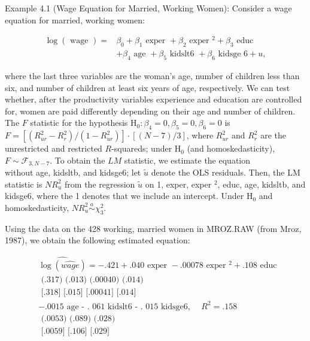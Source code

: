\documentclass[10pt]{article}
\begin{document}
Example 4.1 (Wage Equation for Married, Working Women): Consider a wage equation for married, working women:


\begin{align*}
\log (\text { wage })= & \beta_{0}+\beta_{1} \text { exper }+\beta_{2} \text { exper }^{2}+\beta_{3} \text { educ } \\
& +\beta_{4} \text { age }+\beta_{5} \text { kidslt6 }+\beta_{6} \text { kidsge } 6+u, \tag{4.16}
\end{align*}


where the last three variables are the woman's age, number of children less than six, and number of children at least six years of age, respectively. We can test whether, after the productivity variables experience and education are controlled for, women are paid differently depending on their age and number of children. The $F$ statistic for the hypothesis $\mathrm{H}_{0}: \beta_{4}=0, \beta_{5}=0, \beta_{6}=0$ is $F=\left[\left(R_{u r}^{2}-R_{r}^{2}\right) /\left(1-R_{u r}^{2}\right)\right] \cdot[(N-7) / 3]$, where $R_{u r}^{2}$ and $R_{r}^{2}$ are the unrestricted and restricted $R$-squareds; under $\mathrm{H}_{0}$ (and homoskedasticity), $F \sim \mathscr{F}_{3, N-7}$. To obtain the $L M$ statistic, we estimate the equation\\
without age, kidsltb, and kidsge6; let $\tilde{u}$ denote the OLS residuals. Then, the LM statistic is $N R_{u}^{2}$ from the regression $\tilde{u}$ on 1, exper, exper ${ }^{2}$, educ, age, kidsltb, and kidsge6, where the 1 denotes that we include an intercept. Under $\mathrm{H}_{0}$ and homoskedasticity, $N R_{u}^{2} \stackrel{a}{\sim} \chi_{3}^{2}$.

Using the data on the 428 working, married women in MROZ.RAW (from Mroz, 1987), we obtain the following estimated equation:

$$
\begin{aligned}
& \widehat{\log (\widehat{w a g e})}=-.421+.040 \text { exper }-.00078 \text { exper }^{2}+.108 \text { educ } \\
& \text { (.317) (.013) (.00040) (.014) } \\
& \text { [.318] [.015] [.00041] [.014] } \\
& -.0015 \text { age - . } 061 \text { kidslt6 - . } 015 \text { kidsge6, } \quad R^{2}=.158 \\
& \text { (.0053) (.089) (.028) } \\
& \text { [.0059] [.106] [.029] }
\end{aligned}
$$
\end{document}
